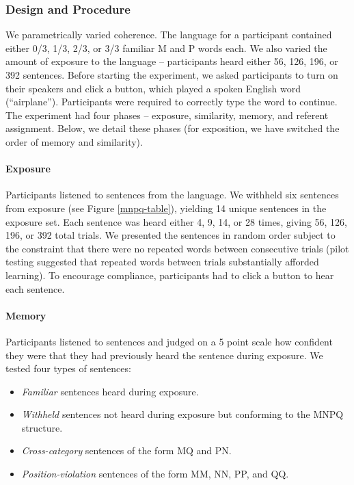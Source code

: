 \documentclass[man,floatsintext]{apa6}
\begin{document}
\subsubsection{Design and Procedure}

We parametrically varied coherence. The language for a participant contained either 0/3, 1/3, 2/3, or 3/3 familiar M and P words each. We also varied the amount of exposure to the language -- participants heard either 56, 126, 196, or 392 sentences. Before starting the experiment, we asked participants to turn on their speakers and click a button, which played a spoken English word (``airplane''). Participants were required to correctly type the word to continue. The experiment had four phases -- exposure, similarity, memory, and referent assignment. Below, we detail these phases (for exposition, we have switched the order of memory and similarity).

\paragraph{Exposure}
Participants listened to sentences from the language. We withheld six sentences from exposure (see Figure \ref{mnpq-table}), yielding 14 unique sentences in the exposure set. Each sentence was heard either 4, 9, 14, or 28 times, giving 56, 126, 196, or 392 total trials. We presented the sentences in random order subject to the constraint that there were no repeated words between consecutive trials (pilot testing suggested that repeated words between trials substantially afforded learning). To encourage compliance, participants had to click a button to hear each sentence.

\paragraph{Memory}
Participants listened to sentences and judged on a 5 point scale how confident they were that they had previously heard the sentence during exposure. We tested four types of sentences:

\begin{itemize}
\item \emph{Familiar} sentences heard during exposure.
\item \emph{Withheld} sentences not heard during exposure but
conforming to the MNPQ structure.
\item \emph{Cross-category} sentences of the form MQ and PN.
\item \emph{Position-violation} sentences of the form MM, NN, PP, and
QQ.
\end{itemize}
\end{document}
